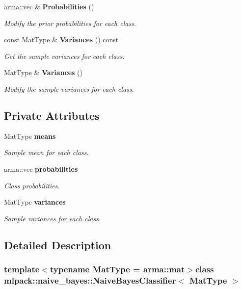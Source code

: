 \begin{DoxyCompactItemize}
arma\-::vec \& {\bf Probabilities} ()
\begin{DoxyCompactList}\small\item\em Modify the prior probabilities for each class. \end{DoxyCompactList}\item 
const Mat\-Type \& {\bf Variances} () const 
\begin{DoxyCompactList}\small\item\em Get the sample variances for each class. \end{DoxyCompactList}\item 
Mat\-Type \& {\bf Variances} ()
\begin{DoxyCompactList}\small\item\em Modify the sample variances for each class. \end{DoxyCompactList}\end{DoxyCompactItemize}
\subsection*{Private Attributes}
\begin{DoxyCompactItemize}
\item 
Mat\-Type {\bf means}
\begin{DoxyCompactList}\small\item\em Sample mean for each class. \end{DoxyCompactList}\item 
arma\-::vec {\bf probabilities}
\begin{DoxyCompactList}\small\item\em Class probabilities. \end{DoxyCompactList}\item 
Mat\-Type {\bf variances}
\begin{DoxyCompactList}\small\item\em Sample variances for each class. \end{DoxyCompactList}\end{DoxyCompactItemize}


\subsection{Detailed Description}
\subsubsection*{template$<$typename Mat\-Type = arma\-::mat$>$class mlpack\-::naive\-\_\-bayes\-::\-Naive\-Bayes\-Classifier$<$ Mat\-Type $>$}

